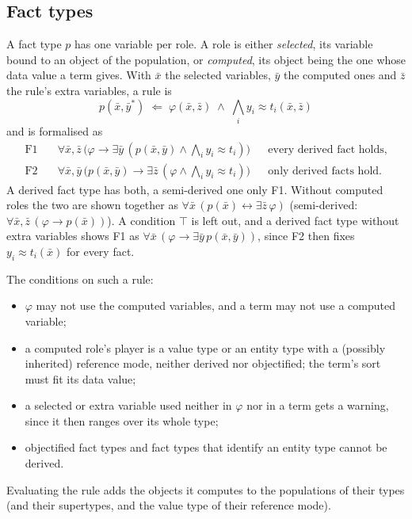 \documentclass[11pt, a4paper]{article}
\begin{document}
\subsection{Fact types}
\label{sec:factrules}

A fact type $p$ has one variable per role. A role is either
\emph{selected}, its variable bound to an object of the population, or
\emph{computed}, its object being the one whose data value a term gives.
With $\bar x$ the selected variables, $\bar y$ the computed ones and $\bar z$
the rule's extra variables, a rule is
\[
  p(\bar x, \bar y^{*}) \;\Leftarrow\; \varphi(\bar x, \bar z) \;\wedge\; \textstyle\bigwedge_i y_i \approx t_i(\bar x, \bar z)
\]
and is formalised as
\begin{align*}
  \mathrm{F1}\quad & \forall \bar x, \bar z\,\bigl(\varphi \to \exists \bar y\,(p(\bar x,\bar y) \wedge \textstyle\bigwedge_i y_i\approx t_i)\bigr) && \text{every derived fact holds,}\\
  \mathrm{F2}\quad & \forall \bar x, \bar y\,\bigl(p(\bar x,\bar y) \to \exists \bar z\,(\varphi \wedge \textstyle\bigwedge_i y_i\approx t_i)\bigr) && \text{only derived facts hold.}
\end{align*}
A derived fact type has both, a semi-derived one only F1. Without computed
roles the two are shown together as
$\forall\bar x\,(p(\bar x)\leftrightarrow\exists\bar z\,\varphi)$ (semi-derived:
$\forall\bar x,\bar z\,(\varphi\to p(\bar x))$). A condition $\top$ is left
out, and a derived fact type without extra variables shows F1 as
$\forall\bar x\,(\varphi\to\exists\bar y\,p(\bar x,\bar y))$, since F2 then
fixes $y_i\approx t_i(\bar x)$ for every fact.

The conditions on such a rule:
\begin{itemize}
  \item $\varphi$ may not use the computed variables, and a term may not use
        a computed variable;
  \item a computed role's player is a value type or an entity type with a
        (possibly inherited) reference mode, neither derived nor
        objectified; the term's sort must fit its data value;
  \item a selected or extra variable used neither in $\varphi$ nor in a term
        gets a warning, since it then ranges over its whole type;
  \item objectified fact types and fact types that identify an entity type
        cannot be derived.
\end{itemize}
Evaluating the rule adds the objects it computes to the populations of their
types (and their supertypes, and the value type of their reference mode).
\end{document}
